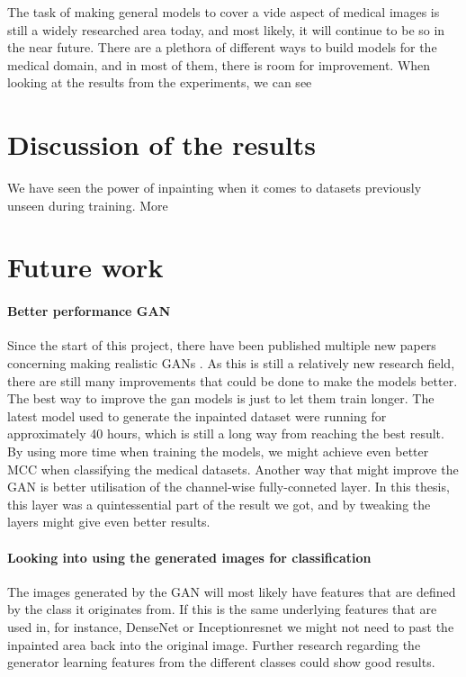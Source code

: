 The task of making general models to cover a vide aspect of medical images is still a widely researched area today, and most likely, it will continue to be so in the near future. There are a  plethora of different ways to build models for the medical domain, and in most of them, there is room for improvement.
When looking at the results from the experiments, we can see 

\section{Discussion of the results}
We have seen the power of inpainting when it comes to datasets previously unseen during training.
More
\section{Future work}

\paragraph{Better performance GAN}
Since the start of this project, there have been published multiple new papers concerning making realistic GANs \cite{DBLP:journals/corr/abs-1809-11096} \cite{DBLP:journals/corr/abs-1812-04948}. As this is still a relatively new research field, there are still many improvements that could be done to make the models better.
The best way to improve the gan models is just to let them train longer. The latest model used to generate the inpainted dataset were running for approximately 40 hours, which is still a long way from reaching the best result. By using more time when training the models, we might achieve even better MCC when classifying the medical datasets.
Another way that might improve the GAN is better utilisation of the channel-wise fully-conneted layer. In this thesis, this layer was a quintessential part of the result we got, and by tweaking the layers might give even better results.


\paragraph{Looking into using the generated images for classification}
The images generated by the GAN will most likely have features that are defined by the class it originates from. If this is the same underlying features that are used in, for instance, DenseNet or Inceptionresnet we might not need to past the inpainted area back into the original image.
Further research regarding the generator learning features from the different classes could show good results.

